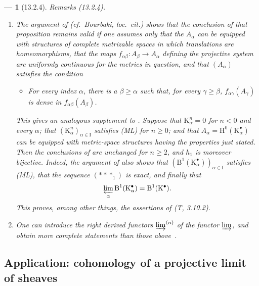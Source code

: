 \documentclass[oneside]{amsart}
\theoremstyle{ega-env-style}
\newtheorem*{env}{---}
\theoremstyle{ega-thm-env-style}
\theoremstyle{ega-defn-env-style}
\def\geq{\geqslant}                 %
\def\HH{\mathrm{H}}                 %
\let\EGAOriginalLabel\label
\renewcommand{\label}[1]{\phantomsection\EGAOriginalLabel{#1}}
\begin{document}
\begin{env}[13.2.4]
\label{0.13.2.4}
\emph{Remarks} (13.2.4).
\begin{enumerate}
  \item[{\rm(i)}]
  The argument of 
  (cf.\ Bourbaki, \emph{loc.\ cit.}) shows that the conclusion of
  that proposition remains valid if one assumes only that the
  $A_\alpha$ can be equipped with structures of complete metrizable
  spaces in which translations are homeomorphisms, that the maps
  $f_{\alpha\beta}:A_\beta\longrightarrow A_\alpha$ defining the
  projective system are uniformly continuous for the metrics in
  question, and that $(A_\alpha)$ satisfies the condition
  \begin{itemize}
    \item[\textbf{(ML')}]
    \emph{For every index $\alpha$, there is a $\beta\geq\alpha$ such
    that, for every $\gamma\geq\beta$,
    $f_{\alpha\gamma}(A_\gamma)$ is dense in
    $f_{\alpha\beta}(A_\beta)$.}
  \end{itemize}

  This gives an analogous supplement to .
  Suppose that $\mathrm{K}^n_\alpha=0$ for $n<0$ and every $\alpha$;
  that
  $(\mathrm{K}^n_\alpha)_{\alpha\in\mathrm{I}}$ satisfies (ML) for
  $n\geq0$; and that
  $A_\alpha=\HH^0(\mathrm{K}^\bullet_\alpha)$ can be equipped with
  metric-space structures having the properties just stated.
  Then the conclusions of  are unchanged for
  $n\geq2$, and $h_1$ is moreover \emph{bijective}.
  Indeed, the argument of  also shows that
  $(\mathrm{B}^1(\mathrm{K}^\bullet_\alpha))_{\alpha\in\mathrm{I}}$
  satisfies (ML), that the sequence $(***_1)$ is exact, and finally
  that
  \[
    \varprojlim_\alpha
    \mathrm{B}^1(\mathrm{K}^\bullet_\alpha)
    =
    \mathrm{B}^1(\mathrm{K}^\bullet).
  \]
  This proves, among other things, the assertions of (T, 3.10.2).

  \item[{\rm(ii)}]
  One can introduce the right derived functors
  $\varinjlim^{(n)}$ of the functor $\varinjlim$, and obtain more
  complete statements than those above~\cite{III-28}.
\end{enumerate}
\end{env}

\subsection{Application: cohomology of a projective limit of sheaves}
\label{subsection:0.13.3}
\end{document}
